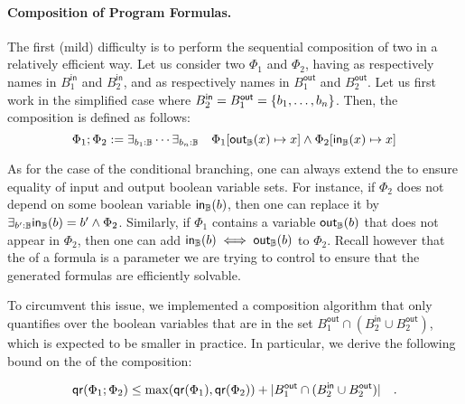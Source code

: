 \paragraph{Composition of Program Formulas.} The first (mild) difficulty is to
perform the sequential composition of two  in a relatively
efficient way. Let us consider two  $\Phi_1$ and $\Phi_2$,
having as  respectively names in
$B_1^{\mathsf{in}}$ and $B_2^{\mathsf{in}}$, and as  respectively names in $B_1^{\mathsf{out}}$ and $B_2^{\mathsf{out}}$.
Let us first work in 
the simplified case where $B_2^{\mathsf{in}} =
B_1^{\mathsf{out}} = \{ b_1, \dots, b_n \}$.
Then, the composition is
defined as follows:
\begin{equation*}
    \Phi_1 ; \Phi_2 :=
    \exists_{b_1 : \mathbb{B}} \cdots \exists_{b_n : \mathbb{B}}
    \quad
    \Phi_1[ \mathsf{out}_{\mathbb{B}}(x) \mapsto x ]
    \wedge 
    \Phi_2[ \mathsf{in}_{\mathbb{B}}(x) \mapsto x ]
\end{equation*}

As for the case of the conditional branching, one can always extend the
 to ensure equality of input and output boolean variable
sets. For instance, if $\Phi_2$ does not depend on some boolean variable
$\mathsf{in}_{\mathbb{B}}(b)$, then one can replace it by $\exists_{b' : \mathbb{B}} \mathsf{in}_{\mathbb{B}}(b) =
b' \wedge \Phi_2$. Similarly, if $\Phi_1$ contains a variable $\mathsf{out}_{\mathbb{B}}(b)$ that
does not appear in $\Phi_2$, then one can add $\mathsf{in}_{\mathbb{B}}(b) \iff \mathsf{out}_{\mathbb{B}}(b)$ to
$\Phi_2$. Recall however that the  of a formula is a
parameter we are trying to control to ensure that the generated formulas are
efficiently solvable.

To circumvent this issue, we implemented a composition algorithm that only
quantifies over the boolean variables that are in the set $B_1^{\mathsf{out}}
\cap (B_2^{\mathsf{in}} \cup B_2^{\mathsf{out}})$, which is expected
to be smaller in practice. In particular, we derive the following bound
on the  of the composition:

\begin{equation*}
    \mathop{\mathsf{qr}}(\Phi_1 ; \Phi_2) 
    \leq \max(\mathop{\mathsf{qr}}(\Phi_1), \mathop{\mathsf{qr}}(\Phi_2)) 
    +    |B_1^{\mathsf{out}} \cap (B_2^{\mathsf{in}} \cup B_2^{\mathsf{out}})|
    \quad .
\end{equation*}


